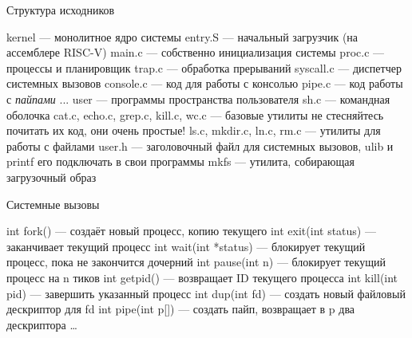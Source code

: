 \documentclass{../../slides-style}
\begin{document}
    \begin{frame}{Структура исходников}
        \begin{outline}
            \1 kernel --- монолитное ядро системы
                \2 entry.S --- начальный загрузчик (на ассемблере RISC-V)
                \2 main.c --- собственно инициализация системы
                \2 proc.c --- процессы и планировщик
                \2 trap.c --- обработка прерываний
                \2 syscall.c --- диспетчер системных вызовов
                \2 console.c --- код для работы с консолью
                \2 pipe.c --- код работы с \textit{пайпами}
                \2 ...
            \1 user --- программы пространства пользователя
                \2 sh.c --- командная оболочка
                \2 cat.c, echo.c, grep.c, kill.c, wc.c --- базовые утилиты
                    \3 не стесняйтесь почитать их код, они очень простые!
                \2 ls.c, mkdir.c, ln.c, rm.c --- утилиты для работы с файлами
                \2 user.h --- заголовочный файл для системных вызовов, ulib и printf 
                    \3 его подключать в свои программы
            \1 mkfs --- утилита, собирающая загрузочный образ
        \end{outline}
    \end{frame}

    \begin{frame}{Системные вызовы}
        \begin{outline}
            \1 int fork() --- создаёт новый процесс, копию текущего
            \1 int exit(int status) --- заканчивает текущий процесс
            \1 int wait(int *status) --- блокирует текущий процесс, пока не закончится дочерний
            \1 int pause(int n) --- блокирует текущий процесс на n тиков
            \1 int getpid() --- возвращает ID текущего процесса
            \1 int kill(int pid) --- завершить указанный процесс
            \1 int dup(int fd) --- создать новый файловый дескриптор для fd
            \1 int pipe(int p[]) --- создать пайп, возвращает в p два дескриптора
            \1 \dots
        \end{outline}
    \end{frame}
\end{document}
